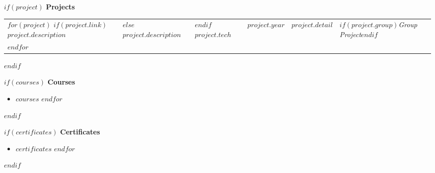 \documentclass[]{$documentclass$}
\newcommand\mytitle[1]{\vspace{5mm}\textbf{\Large #1}\par\vspace{5pt}}
\def\titleprojects{Prosjekter}
\def\groupproject{Gruppeprosjekt}
\def\titlecourses{Kurs}
\def\titlecertificates{Sertifikater}
\def\titleprojects{Projects}
\def\groupproject{Group Project}
\def\titlecourses{Courses}
\def\titlecertificates{Certificates}
\begin{document}
{    $if(project)$
    \mytitle{\titleprojects}
    \begin{tabular}{@{\hspace{0pt}}lllll}
        $for(project)$
            $if(project.link)$
                \href{$project.link$}{$project.description$} &
            $else$
                $project.description$ & 
            $endif$
            \texttt{$project.tech$} & 
            $project.year$ & 
            \textit{$project.detail$} &
            $if(project.group)$\textit{\groupproject}$endif$ \\
        $endfor$
    \end{tabular}
    $endif$

    \begin{minipage}[t]{.49\textwidth}
        $if(courses)$
        \mytitle{\titlecourses}
        \begin{itemize}
        $for(courses)$
            \item $courses$
        $endfor$
        \end{itemize}
        $endif$
    \end{minipage}\hfill
    \begin{minipage}[t]{.49\textwidth}
        $if(certificates)$
        \mytitle{\titlecertificates}
        \begin{itemize}
        $for(certificates)$
            \item $certificates$
        $endfor$
        \end{itemize}
        $endif$
    \end{minipage}

}
\end{document}
